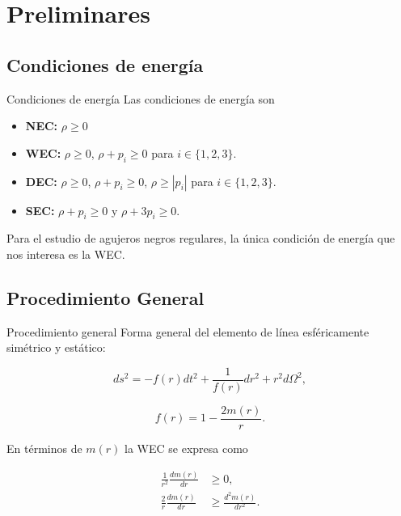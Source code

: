 \documentclass[t]{beamer}
\numberwithin{equation}{section}
\begin{document}
\section{\label{preliminaries section} Preliminares}


\subsection{Condiciones de energía}

\begin{frame}{Condiciones de energía}
\vspace{\fill}
Las condiciones de energía son \cite{carroll,hawking}

\begin{itemize}
\item \textbf{NEC:} $\rho \geq 0$
\vspace*{\fill}
\item \textbf{WEC:} $\rho \geq 0$,  $\rho + p_{i} \geq 0$ para $i \in \{1,2,3\}$.
\vspace*{\fill}
\item \textbf{DEC:} $\rho \geq 0$,  $\rho + p_{i} \geq 0$, $\rho \geq |p_{i}|$ para $i \in \{1,2,3\}$.
\vspace*{\fill}
\item \textbf{SEC:} $\rho + p_{i} \geq 0$ y $\rho + 3p_{i} \geq 0$.
\end{itemize}


Para el estudio de agujeros negros regulares, la única condición de energía que nos interesa es la WEC.
\vspace{\fill}
\end{frame}

\subsection{Procedimiento General}

\begin{frame}{Procedimiento general}
Forma general del elemento de línea esféricamente simétrico y estático:

\begin{equation}
\label{general static spherical}
ds^2 = -f(r)dt^2 + \frac{1}{f(r)}dr^2 + r^2d\Omega^2,
\end{equation}

\begin{equation}
\label{general f}
f(r) = 1 - \frac{2m(r)}{r}.
\end{equation}

En términos de $m(r)$ la WEC se expresa como \cite{vanegas-weak}

\begin{equation}
\label{mass wec ineq}
\begin{aligned}
\frac{1}{r^2}\frac{dm(r)}{dr} &\geq 0,\\
\frac{2}{r}\frac{dm(r)}{dr} &\geq \frac{d^2m(r)}{dr^2}.
\end{aligned}
\end{equation}

\end{frame}
\end{document}
